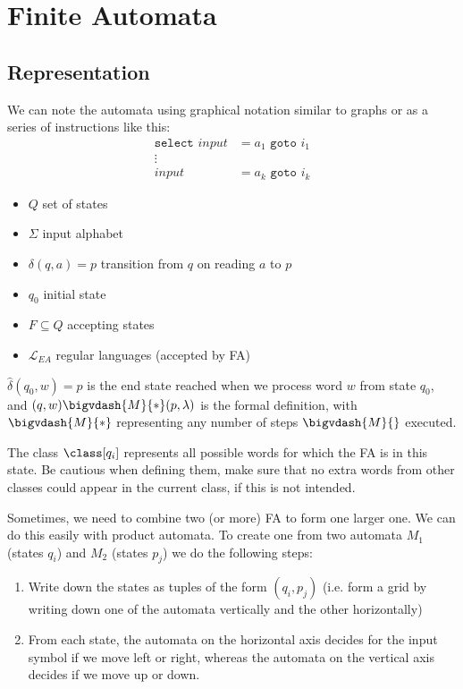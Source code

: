 \newsection
\section{Finite Automata}
\subsection{Representation}
We can note the automata using graphical notation similar to graphs or as a series of instructions like this:
\rmvspace
\begin{align*}
    \texttt{select } input & = a_1 \texttt{ goto } i_1 \\[-0.2cm]
    \vdots                                             \\
    input                  & = a_k \texttt{ goto } i_k
\end{align*}

\drmvspace
{}
\drmvspace
\begin{multicols}{2}
    \begin{itemize}
        \item $Q$ set of states
        \item $\Sigma$ input alphabet
        \item $\delta(q, a) = p$ transition from $q$ on reading $a$ to $p$
        \item $q_0$ initial state
        \item $F \subseteq Q$ accepting states
        \item $\mathcal{L}_{EA}$ regular languages (accepted by FA)
    \end{itemize}
\end{multicols}

\drmvspace
$\hat{\delta}(q_0, w) = p$ is the end state reached when we process word $w$ from state $q_0$, and $(q, w) \bigvdash{M}{*} (p, \lambda)$ is the formal definition,
with $\bigvdash{M}{*}$ representing any number of steps $\bigvdash{M}{}$ executed.

The class $\class[q_i]$ represents all possible words for which the FA is in this state.
Be cautious when defining them, make sure that no extra words from other classes could appear in the current class, if this is not intended.

Sometimes, we need to combine two (or more) FA to form one larger one.
We can do this easily with product automata. To create one from two automata $M_1$ (states $q_i$) and $M_2$ (states $p_j$) we do the following steps:
\rmvspace
\begin{enumerate}[noitemsep]
    \item Write down the states as tuples of the form $(q_i, p_j)$ (i.e. form a grid by writing down one of the automata vertically and the other horizontally)
    \item From each state, the automata on the horizontal axis decides for the input symbol if we move left or right,
          whereas the automata on the vertical axis decides if we move up or down.
\end{enumerate}

